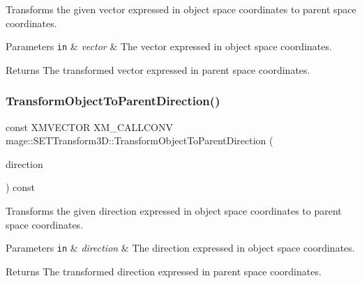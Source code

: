 Transforms the given vector expressed in object space coordinates to parent space coordinates.


\begin{DoxyParams}[1]{Parameters}
\mbox{\tt in}  & {\em vector} & The vector expressed in object space coordinates. \\
\hline
\end{DoxyParams}
\begin{DoxyReturn}{Returns}
The transformed vector expressed in parent space coordinates. 
\end{DoxyReturn}
\mbox{\label{classmage_1_1_s_e_t_transform3_d_a3f6dac1778bc2c72a1bc183f117c045e}} 
\subsubsection{\texorpdfstring{Transform\+Object\+To\+Parent\+Direction()}{TransformObjectToParentDirection()}}
{\footnotesize\ttfamily const X\+M\+V\+E\+C\+T\+OR X\+M\+\_\+\+C\+A\+L\+L\+C\+O\+NV mage\+::\+S\+E\+T\+Transform3\+D\+::\+Transform\+Object\+To\+Parent\+Direction (\begin{DoxyParamCaption}\item[{F\+X\+M\+V\+E\+C\+T\+OR}]{direction }\end{DoxyParamCaption}) const\hspace{0.3cm}{\ttfamily [noexcept]}}

Transforms the given direction expressed in object space coordinates to parent space coordinates.


\begin{DoxyParams}[1]{Parameters}
\mbox{\tt in}  & {\em direction} & The direction expressed in object space coordinates. \\
\hline
\end{DoxyParams}
\begin{DoxyReturn}{Returns}
The transformed direction expressed in parent space coordinates. 
\end{DoxyReturn}
\mbox{\label{classmage_1_1_s_e_t_transform3_d_af6985066fa275561add80a83a5c32d3e}} 
